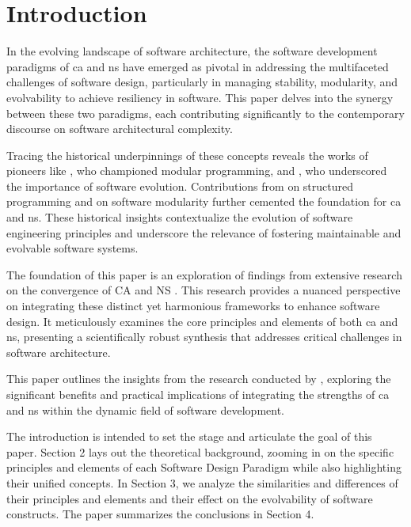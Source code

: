 \section{Introduction} \label{sec:introduction} 

In the evolving landscape of software architecture, the software development paradigms of
\gls{ca} and \gls{ns} have emerged as pivotal in addressing the multifaceted challenges of
software design, particularly in managing stability, modularity, and evolvability to
achieve resiliency in software. This paper delves into the synergy between these two
paradigms, each contributing significantly to the contemporary discourse on software
architectural complexity.

Tracing the historical underpinnings of these concepts reveals the works of pioneers like
\textcite{d_mcilroy_nato_1968}, who championed modular programming, and
\textcite{lehman_programs_1980}, who underscored the importance of software evolution.
Contributions from \textcite{dijkstra_letters_1968} on structured programming and
\textcite{parnas_criteria_1972} on software modularity further cemented the foundation for
\gls{ca} and \gls{ns}. These historical insights contextualize the evolution of software
engineering principles and underscore the relevance of fostering maintainable and
evolvable software systems.

The foundation of this paper is an exploration of findings from extensive research on
the convergence of CA and NS \cite{koks_convergence_2023}. This research provides a
nuanced perspective on integrating these distinct yet harmonious frameworks to enhance
software design. It meticulously examines the core principles and elements of both
\gls{ca} and \gls{ns}, presenting a scientifically robust synthesis that addresses
critical challenges in software architecture.

This paper outlines the insights from the research conducted by
, exploring the significant benefits and practical
implications of integrating the strengths of \gls{ca} and \gls{ns} within the dynamic
field of software development. 


The introduction is intended to set the stage and articulate the goal of this paper.
Section 2 lays out the theoretical background, zooming in on the specific principles and
elements of each Software Design Paradigm while also highlighting their unified concepts.
In Section 3, we analyze the similarities and differences of their principles and elements
and their effect on the evolvability of software constructs. The paper summarizes the
conclusions in Section 4.